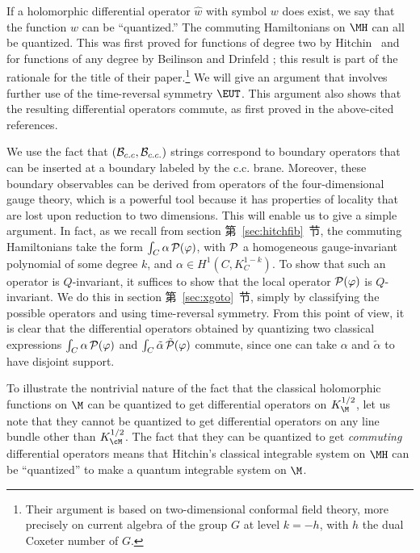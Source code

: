 If a holomorphic differential operator $\hat w$ with symbol $w$
does exist, we say that the function $w$ can be ``quantized.'' The
commuting Hamiltonians on $\MH$ can all be quantized.  This was
first proved for functions of degree two by Hitchin \cite{ref141}\
and for functions of any degree by Beilinson and Drinfeld \cite{ref5};
this result is part of the rationale for the title of their
paper.\footnote{Their argument is based on two-dimensional conformal
field theory, more precisely on current algebra of the group $G$
at level $k=-h$, with $h$ the dual Coxeter number of $G$.} We will
give an argument that involves further use of the time-reversal
symmetry $\EUT$. This argument also shows that the resulting
differential operators commute, as first proved in the above-cited
references.

We use the fact that $({\cal B}_{c.c},{\cal B}_{c.c.})$ strings
correspond to boundary operators that can be inserted at a
boundary labeled by the c.c. brane.  Moreover, these boundary
observables can be derived from operators of the four-dimensional
gauge theory, which is a powerful tool because it has properties
of locality that are lost upon reduction to two dimensions.  This
will enable us to give a simple argument.  In fact, as we recall
from section 第~\ref{sec:hitchfib}~节, the commuting Hamiltonians take the form
$\int_C \alpha\,{\cal P}(\varphi)$, with ${\cal P}$ a homogeneous
gauge-invariant polynomial of some degree $k$, and $\alpha\in
H^1(C,K_C^{1-k})$.  To show that such an operator is
$Q$-invariant, it suffices to show that the local operator ${\cal
P}(\varphi)$ is $Q$-invariant.  We do this in section 第~\ref{sec:xgoto}~节,
simply by classifying the possible operators and using
time-reversal symmetry.  From this point of view, it is clear that
the differential operators obtained by quantizing two classical
expressions $\int_C \alpha \,{\cal P}(\varphi)$ and $\int_C\tilde
\alpha \,\tilde {\cal P}(\varphi)$ commute, since one can take
$\alpha$ and $\tilde\alpha$ to have disjoint support.

To illustrate the nontrivial nature of the fact that the classical
holomorphic functions on $\M$ can be quantized to get differential
operators on $K_\M^{1/2}$, let us note \cite{ref141,ref5}
that they cannot be quantized to get differential operators on any
line bundle other than $K_\cM^{1/2}$.   The fact that they can be
quantized to get {\it commuting} differential operators means that
Hitchin's classical integrable system on $\MH$ can be
``quantized'' to make a quantum integrable system on $\M$.
